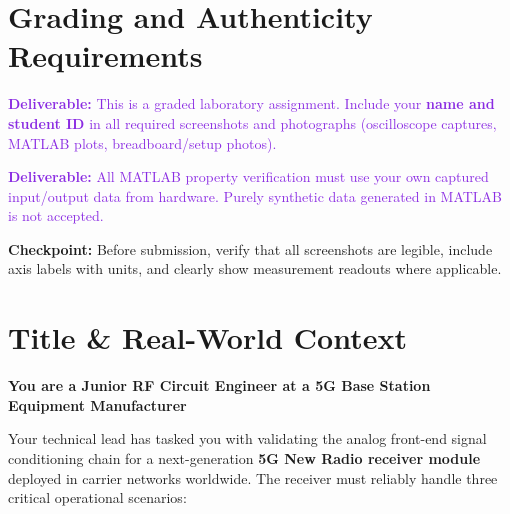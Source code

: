 \documentclass[11pt,letterpaper]{article}
\providecommand{\cpECE}[1]{\textcolor{OliveGreen}{\textbf{Checkpoint:} #1}}
\providecommand{\delECE}[1]{\textcolor{BlueViolet}{\textbf{Deliverable:} #1}}
\begin{document}
\clearpage

\section*{Grading and Authenticity Requirements}

\delECE{This is a graded laboratory assignment. Include your \textbf{name and student ID} in all required screenshots and photographs (oscilloscope captures, MATLAB plots, breadboard/setup photos).}

\delECE{All MATLAB property verification must use your own captured input/output data from hardware. Purely synthetic data generated in MATLAB is not accepted.}

\cpECE{Before submission, verify that all screenshots are legible, include axis labels with units, and clearly show measurement readouts where applicable.}

\clearpage

\section*{Title \& Real-World Context}

\noindent
\textbf{\large You are a Junior RF Circuit Engineer at a 5G Base Station Equipment Manufacturer}

\noindent
Your technical lead has tasked you with validating the analog front-end signal conditioning chain for a next-generation \textbf{5G New Radio receiver module} deployed in carrier networks worldwide. The receiver must reliably handle three critical operational scenarios:
\end{document}
